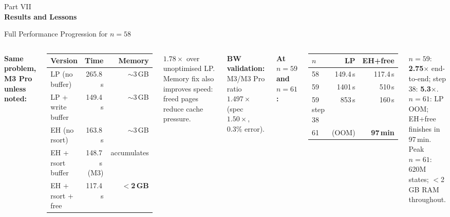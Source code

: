 \documentclass[aspectratio=169,t]{beamer}
\begin{document}
{
\begin{frame}[plain]
  \vspace{2cm}
  \begin{center}
    {\color{lightblue}\small Part VII}\\[0.4cm]
    {\color{white}\LARGE\bfseries Results and Lessons}
  \end{center}
\end{frame}
}

\begin{frame}{Full Performance Progression for $n=58$}
\small
\begin{columns}[c]
\textbf{Same problem, M3 Pro unless noted:}

\vspace{0.1cm}
\begin{center}
\begin{tabular}{lrr}
\toprule
Version & Time & Memory \\
\midrule
LP (no buffer) & 265.8\,s & $\sim$3\,GB \\
LP + write buffer & 149.4\,s & $\sim$3\,GB \\
EH (no rsort) & 163.8\,s & $\sim$3\,GB \\
EH + rsort buffer & 148.7\,s\,{\small(M3)} & accumulates \\
\rowcolor{dkgreen!15}
EH + rsort + free & 117.4\,s & \textbf{$<$2\,GB} \\
\bottomrule
\end{tabular}
\end{center}

\vspace{0.1cm}
$1.78\times$ over unoptimised LP. Memory fix also improves speed: freed pages reduce cache pressure.

\vspace{0.1cm}
\textbf{BW validation:} M3/M3 Pro ratio $1.497\times$ (spec $1.50\times$, 0.3\% error).

\textbf{At $n=59$ and $n=61$:}

\vspace{0.1cm}
\begin{center}
\begin{tabular}{lrr}
\toprule
$n$ & LP & EH+free \\
\midrule
58 & 149.4\,s & 117.4\,s \\
59 & 1401\,s & 510\,s \\
\rowcolor{accent!10}
59 step 38 & 853\,s & 160\,s \\
\midrule
61 & (OOM) & \textbf{97\,min} \\
\bottomrule
\end{tabular}
\end{center}

\vspace{0.1cm}
$n=59$: \textbf{2.75$\times$} end-to-end; step 38: \textbf{5.3$\times$}.\\
$n=61$: LP OOM; EH+free finishes in 97\,min.\\
{\small Peak $n=61$: 620M states; $<$2\,GB RAM throughout.}
\end{columns}
\end{frame}
\end{document}
